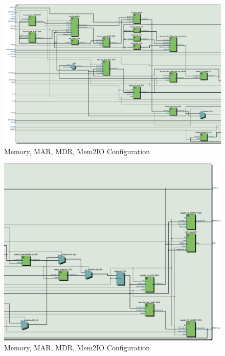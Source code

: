 \documentclass[journal, twocolumn, final,11pt,letterpaper]{IEEEtran}
\begin{document}
\begin{figure} [htbp]
	\centering
	\includegraphics[scale=0.4]{datapath_input_circuit.png}
	\caption{Memory, MAR, MDR, Mem2IO Configuration\label{fig:datapath-circuit-input}}
\end{figure}

\begin{figure} [htbp]
	\centering
	\includegraphics[scale=0.4]{datapath_output_circuit.png}
	\caption{Memory, MAR, MDR, Mem2IO Configuration\label{fig:datapath-circuit-output}}
\end{figure}
\end{document}
